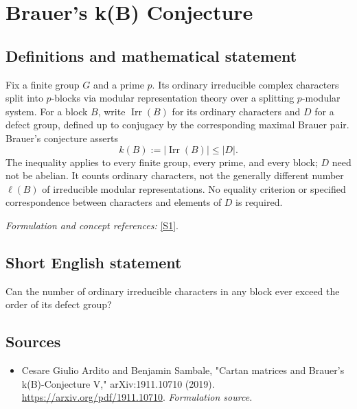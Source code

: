 \documentclass[11pt]{article}
\begin{document}
\section*{\texorpdfstring{Brauer's k(B) Conjecture}{Brauer's k(B) Conjecture}}\label{30006878}
\subsection{Definitions and mathematical statement}
Fix a finite group $G$ and a prime $p$. Its ordinary irreducible complex characters split into $p$-blocks via modular representation theory over a splitting $p$-modular system. For a block $B$, write $\operatorname{Irr}(B)$ for its ordinary characters and $D$ for a defect group, defined up to conjugacy by the corresponding maximal Brauer pair. Brauer's conjecture asserts
\[
 k(B):=|\operatorname{Irr}(B)|\le |D|.
\]
The inequality applies to every finite group, every prime, and every block; $D$ need not be abelian. It counts ordinary characters, not the generally different number $\ell(B)$ of irreducible modular representations. No equality criterion or specified correspondence between characters and elements of $D$ is required.
\par\smallskip\textit{Formulation and concept references:} \href{https://arxiv.org/pdf/1911.10710}{[S1]}.

\subsection{Short English statement}
Can the number of ordinary irreducible characters in any block ever exceed the order of its defect group?
\subsection{Sources}
\begin{itemize}
\item[S1]Cesare Giulio Ardito and Benjamin Sambale, "Cartan matrices and Brauer's k(B)-Conjecture V," arXiv:1911.10710 (2019).
\url{https://arxiv.org/pdf/1911.10710}.
\textit{Formulation source.}
\end{itemize}
\end{document}
